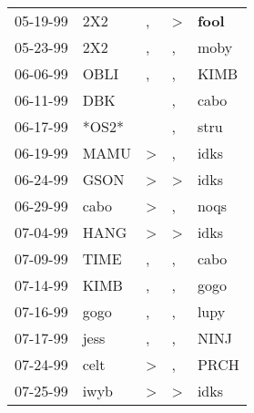 \begin{supertabular}{p{0.07\textwidth}p{0.06\textwidth}p{0.02\textwidth}p{0.02\textwidth}p{0.06\textwidth}}
 05-19-99\textsuperscript{} &            2X2\textsuperscript{} &                , &  \textgreater &  \textbf{fool\textsuperscript{}} \\
 05-23-99\textsuperscript{} &            2X2\textsuperscript{} &                , &             , &           moby\textsuperscript{} \\
 06-06-99\textsuperscript{} &           OBLI\textsuperscript{} &                , &             , &           KIMB\textsuperscript{} \\
 06-11-99\textsuperscript{} &            DBK\textsuperscript{} &                  &             , &           cabo\textsuperscript{} \\
 06-17-99\textsuperscript{} &                            *OS2* &                  &             , &           stru\textsuperscript{} \\
 06-19-99\textsuperscript{} &           MAMU\textsuperscript{} &     \textgreater &             , &           idks\textsuperscript{} \\
 06-24-99\textsuperscript{} &           GSON\textsuperscript{} &     \textgreater &  \textgreater &           idks\textsuperscript{} \\
 06-29-99\textsuperscript{} &           cabo\textsuperscript{} &     \textgreater &             , &           noqs\textsuperscript{} \\
 07-04-99\textsuperscript{} &           HANG\textsuperscript{} &     \textgreater &  \textgreater &           idks\textsuperscript{} \\
 07-09-99\textsuperscript{} &           TIME\textsuperscript{} &                , &             , &           cabo\textsuperscript{} \\
 07-14-99\textsuperscript{} &           KIMB\textsuperscript{} &                , &             , &           gogo\textsuperscript{} \\
 07-16-99\textsuperscript{} &           gogo\textsuperscript{} &                , &             , &           lupy\textsuperscript{} \\
 07-17-99\textsuperscript{} &           jess\textsuperscript{} &                , &             , &           NINJ\textsuperscript{} \\
 07-24-99\textsuperscript{} &           celt\textsuperscript{} &     \textgreater &             , &           PRCH\textsuperscript{} \\
 07-25-99\textsuperscript{} &           iwyb\textsuperscript{} &     \textgreater &  \textgreater &           idks\textsuperscript{} \\

\end{supertabular}
